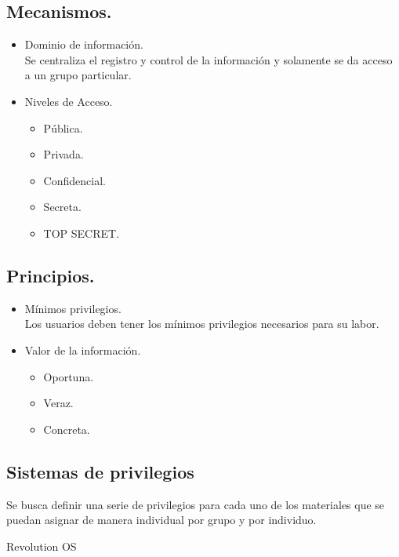 \subsection{Mecanismos.}
\begin{itemize}
	\item Dominio de informaci\'{o}n.\\
		Se centraliza el registro y control de la informaci\'{o}n y solamente se da acceso a un grupo particular.
	\item Niveles de Acceso.\\
	\begin{itemize}
		\item P\'{u}blica.
		\item Privada.
		\item Confidencial.
		\item Secreta.
		\item TOP SECRET.
	\end{itemize}
\end{itemize}

\subsection{Principios.}
\begin{itemize}
	\item M\'{i}nimos privilegios.\\
		Los usuarios deben tener los m\'{i}nimos privilegios necesarios para su labor.
	\item Valor de la informaci\'{o}n.
	\begin{itemize}
		\item Oportuna.
		\item Veraz.
		\item Concreta.
	\end{itemize}
\end{itemize}

\subsection{Sistemas de privilegios}
Se busca definir una serie de privilegios para cada uno de los materiales que se puedan asignar de manera individual por grupo y por individuo.

\newpage
Revolution OS
